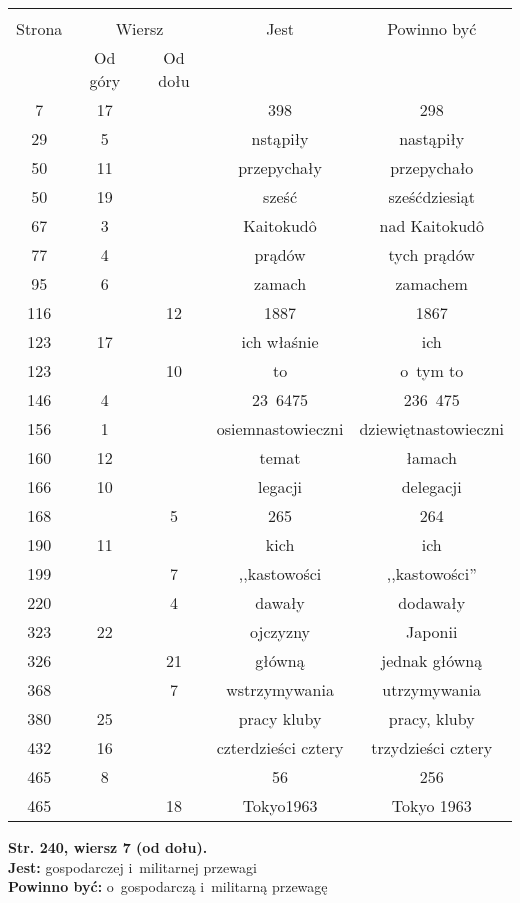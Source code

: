 \documentclass[a4paper,11pt]{article}  %
\newcommand{\tb}{\textbf}
\newcommand{\noi}{\noindent}
\newcommand{\StrWd}[2]{\tb{Str. #1, wiersz #2 (od dołu).}}
\newcommand{\Jest}{\tb{Jest: }}
\newcommand{\Pow}{\tb{Powinno być: }}
\begin{document}
\begin{center}
  \begin{tabular}{|c|c|c|c|c|}
    \hline
    & \multicolumn{2}{c|}{} & & \\
    Strona & \multicolumn{2}{c|}{Wiersz}& Jest & Powinno być \\ \cline{2-3}
    & Od góry & Od dołu &  &  \\ \hline
    7   & 17 & & 398 & 298 \\
    29  &  5 & & nstąpiły & nastąpiły \\
    50  & 11 & & przepychały & przepychało \\
    50  & 19 & & sześć & sześćdziesiąt \\
    67  &  3 & & Kaitokud\^{o} & nad Kaitokud\^{o} \\
    77  &  4 & & prądów & tych prądów \\
    95  &  6 & & zamach & zamachem \\
    116 & & 12 & 1887 & 1867 \\
    123 & 17 & & ich właśnie & ich \\
    123 & & 10 & to & o~tym to \\
    146 &  4 & & 23~6475 & 236~475 \\
    156 &  1 & & osiemnastowieczni & dziewiętnastowieczni \\
    160 & 12 & & temat & łamach \\
    166 & 10 & & legacji & delegacji \\
    168 & & 5 & 265 & 264 \\
    190 & 11 & & kich & ich \\
    199 & & 7 & ,,kastowości %
           & ,,kastowości'' \\
    220 & &  4 & dawały & dodawały \\
    323 & 22 & & ojczyzny & Japonii \\
    326 & & 21 & główną & jednak główną \\
    368 & &  7 & wstrzymywania & utrzymywania \\
    380 & 25 & & pracy kluby & pracy, kluby \\
    432 & 16 & & czterdzieści cztery & trzydzieści cztery \\
    465 &  8 & & 56 & 256 \\
    465 & & 18 & Tokyo1963 & Tokyo 1963 \\
    \hline
  \end{tabular}
\end{center}
\noi
\StrWd{240}{7} \\
\Jest gospodarczej i~militarnej przewagi \\
\Pow  o~gospodarczą i~militarną przewagę \\
\end{document}

